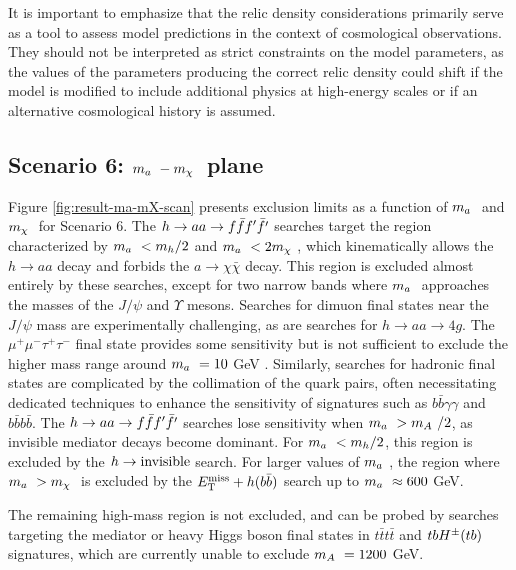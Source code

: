 It is important to emphasize that the relic density considerations primarily serve as a tool to assess \thdma model predictions in the context of cosmological observations. They should not be interpreted as strict constraints on the model parameters, as the values of the parameters producing the correct relic density could shift if the model is modified to include additional physics at high-energy scales or if an alternative cosmological history is assumed.

\subsection{Scenario 6: \texorpdfstring{$m_a~ -m_{\chi}~$}{TEXT} plane}

Figure \ref{fig:result-ma-mX-scan} presents exclusion limits as a function of $m_a~$ and $m_{\chi}~$ for Scenario 6. The $h\rightarrow aa \rightarrow f\bar{f} f'\bar{f'}$ searches target the region characterized by $m_a~<m_h/2$ and $m_a~ < 2m_{\chi}~$, which kinematically allows the $h\rightarrow aa$ decay and forbids the $a\rightarrow \chi\bar{\chi}$ decay. This region is excluded almost entirely by these searches, except for two narrow bands where $m_a~$ approaches the masses of the $J/\psi$ and $\Upsilon$ mesons. Searches for dimuon final states near the $J/\psi$ mass are experimentally challenging, as are searches for $h\rightarrow aa\rightarrow 4g$. The $\mu^+\mu^-\tau^+\tau^-$ final state provides some sensitivity but is not sufficient to exclude the higher mass range around $m_a~=10$ GeV \cite{HIGG-2014-02}. Similarly, searches for hadronic final states are complicated by the collimation of the quark pairs, often necessitating dedicated techniques to enhance the sensitivity of signatures such as $b\bar{b}\gamma\gamma$ and $b\bar{b}b\bar{b}$. The $h\rightarrow aa \rightarrow f\bar{f} f'\bar{f'}$ searches lose sensitivity when $m_a~>m_A~/2$, as invisible mediator decays become dominant. For $m_a~ < m_h/2$, this region is excluded by the $h\rightarrow \mathrm{invisible}$ search. For larger values of $m_a~$, the region where $m_a~>m_{\chi}~$ is excluded by the $E_{\mathrm{T}}^{\mathrm{miss}}+h(b\bar{b})$  search up to $m_a~\approx 600$ GeV. 

The remaining high-mass region is not excluded, and can be probed by searches targeting the mediator or heavy Higgs boson final states in $t\bar{t}t\bar{t}$ and $tbH^{\pm}(tb)$ signatures, which are currently unable to exclude $m_A~=1200$ GeV.

